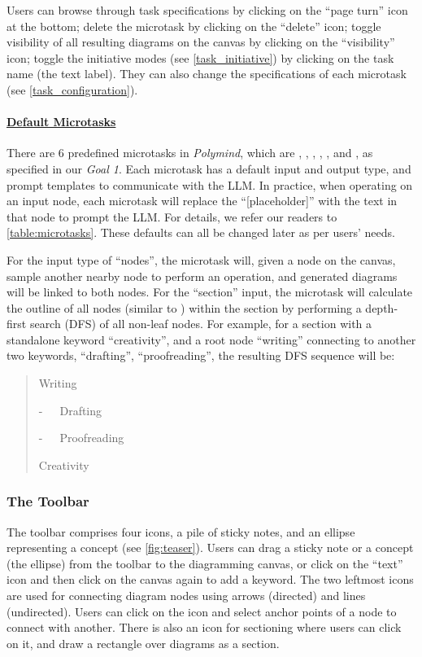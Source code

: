 Users can browse through task specifications by clicking on the ``page turn'' icon at the bottom; delete the microtask by clicking on the ``delete'' icon; toggle visibility of all resulting diagrams on the canvas by clicking on the ``visibility'' icon; toggle the initiative modes (see \ref{task_initiative}) by clicking on the task name (the text label). They can also change the specifications of each microtask (see \ref{task_configuration}).



\paragraph{\underline{Default Microtasks}} There are 6 predefined microtasks in \textit{Polymind}, which are \BboxS{\textcolor{white}{Brainstorm}}, \EboxS{\textcolor{white}{Elaborate}}, \SboxS{\textcolor{white}{Summarise}}, \DboxS{\textcolor{white}{Draft}}, \FboxS{\textcolor{white}{Freewrite}}, and \AboxS{\textcolor{white}{Associate}}, as specified in our \textit{Goal 1}. Each microtask has a default input and output type, and prompt templates to communicate with the LLM. In practice, when operating on an input node, each microtask will replace the ``[placeholder]'' with the text in that node to prompt the LLM. For details, we refer our readers to \autoref{table:microtasks}. These defaults can all be changed later as per users' needs.

For the input type of ``nodes'', the microtask will, given a node on the canvas, sample another nearby node to perform an operation, and generated diagrams will be linked to both nodes. For the ``section'' input, the microtask will calculate the outline of all nodes (similar to \cite{lu2018inkplanner}) within the section by performing a depth-first search (DFS) of all non-leaf nodes. For example, for a section with a standalone keyword ``creativity'', and a root node ``writing'' connecting to another two keywords, ``drafting'', ``proofreading'', the resulting DFS sequence will be:
\begin{quote}
Writing

 -\ \ \ Drafting
 
 -\ \ \ Proofreading
 
 Creativity
\end{quote}

\subsubsection{The Toolbar}
The toolbar comprises four icons, a pile of sticky notes, and an ellipse representing a concept (see \autoref{fig:teaser}). Users can drag a sticky note or a concept (the ellipse) from the toolbar to the diagramming canvas, or click on the ``text'' icon and then click on the canvas again to add a keyword.
The two leftmost icons are used for connecting diagram nodes using arrows (directed) and lines (undirected). Users can click on the icon and select anchor points of a node to connect with another. There is also an icon for sectioning where users can click on it, and draw a rectangle over diagrams as a section.

